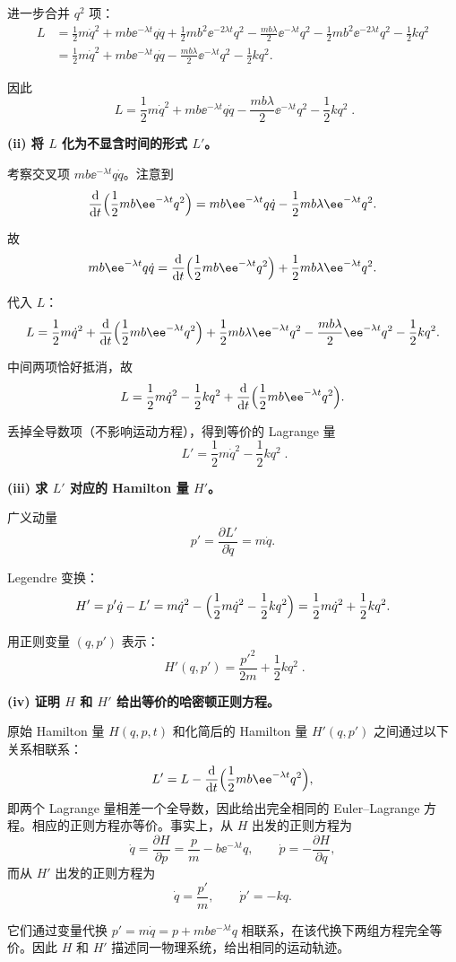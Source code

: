 \begin{question}
\begin{solution}
进一步合并 \(q^2\) 项：
\[
\begin{aligned}
L &= \frac12 m\dot q^2 + m b \ee^{-\lambda t} q\dot q
+ \frac12 m b^2 \ee^{-2\lambda t} q^2
- \frac{mb\lambda}{2} \ee^{-\lambda t} q^2
- \frac12 m b^2 \ee^{-2\lambda t} q^2 - \frac12 k q^2 \\[2mm]
&= \frac12 m\dot q^2 + m b \ee^{-\lambda t} q\dot q
- \frac{mb\lambda}{2} \ee^{-\lambda t} q^2 - \frac12 k q^2 .
\end{aligned}
\]

因此
\[
\boxed{\;L = \frac12 m\dot q^2 + m b \ee^{-\lambda t} q\dot q
- \frac{mb\lambda}{2} \ee^{-\lambda t} q^2 - \frac12 k q^2\;}.
\]

\textbf{(ii) 将 \(L\) 化为不显含时间的形式 \(L'\)。}

考察交叉项 \(m b \ee^{-\lambda t} q\dot q\)。注意到
\[
\frac{\mathrm d}{\mathrm d t}\Bigl(\frac12 m b \ee^{-\lambda t} q^2\Bigr)
= m b \ee^{-\lambda t} q\dot q - \frac12 m b \lambda \ee^{-\lambda t} q^2 .
\]

故
\[
m b \ee^{-\lambda t} q\dot q
= \frac{\mathrm d}{\mathrm d t}\Bigl(\frac12 m b \ee^{-\lambda t} q^2\Bigr)
+ \frac12 m b \lambda \ee^{-\lambda t} q^2 .
\]

代入 \(L\)：
\[
L = \frac12 m\dot q^2
+ \frac{\mathrm d}{\mathrm d t}\Bigl(\frac12 m b \ee^{-\lambda t} q^2\Bigr)
+ \frac12 m b \lambda \ee^{-\lambda t} q^2
- \frac{mb\lambda}{2} \ee^{-\lambda t} q^2 - \frac12 k q^2 .
\]

中间两项恰好抵消，故
\[
L = \frac12 m\dot q^2 - \frac12 k q^2 + \frac{\mathrm d}{\mathrm d t}\Bigl(\frac12 m b \ee^{-\lambda t} q^2\Bigr) .
\]

丢掉全导数项（不影响运动方程），得到等价的 Lagrange 量
\[
\boxed{\;L' = \frac12 m\dot q^2 - \frac12 k q^2\;}.
\]

\textbf{(iii) 求 \(L'\) 对应的 Hamilton 量 \(H'\)。}

广义动量
\[
p' = \frac{\partial L'}{\partial\dot q} = m\dot q .
\]

Legendre 变换：
\[
H' = p'\dot q - L' = m\dot q^2 - \Bigl(\frac12 m\dot q^2 - \frac12 k q^2\Bigr)
= \frac12 m\dot q^2 + \frac12 k q^2 .
\]

用正则变量 \((q,p')\) 表示：
\[
\boxed{\;H'(q,p') = \frac{p'^2}{2m} + \frac12 k q^2\;}.
\]

\textbf{(iv) 证明 \(H\) 和 \(H'\) 给出等价的哈密顿正则方程。}

原始 Hamilton 量 \(H(q,p,t)\) 和化简后的 Hamilton 量 \(H'(q,p')\) 之间通过以下关系相联系：
\[
L' = L - \frac{\mathrm d}{\mathrm d t}\Bigl(\frac12 m b \ee^{-\lambda t} q^2\Bigr),
\]
即两个 Lagrange 量相差一个全导数，因此给出完全相同的 Euler--Lagrange 方程。相应的正则方程亦等价。事实上，从 \(H\) 出发的正则方程为
\[
\dot q = \frac{\partial H}{\partial p} = \frac{p}{m} - b \ee^{-\lambda t} q,\qquad
\dot p = -\frac{\partial H}{\partial q},
\]
而从 \(H'\) 出发的正则方程为
\[
\dot q = \frac{p'}{m},\qquad
\dot p' = -k q .
\]

它们通过变量代换 \(p' = m\dot q = p + m b \ee^{-\lambda t} q\) 相联系，在该代换下两组方程完全等价。因此 \(H\) 和 \(H'\) 描述同一物理系统，给出相同的运动轨迹。
\end{solution}
\end{question}


